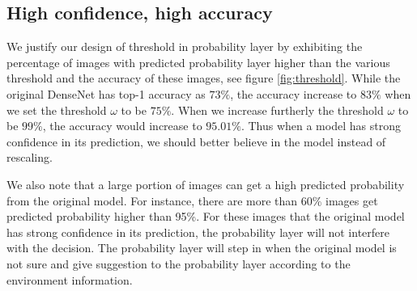 \documentclass[pageno]{jpaper}
\begin{document}
\subsection{High confidence, high accuracy}
We justify our design of threshold in probability layer by exhibiting the percentage of images with predicted probability layer higher than the various threshold and the accuracy of these images, see figure \ref{fig:threshold}. While the original DenseNet has top-1 accuracy as $73\%$, the accuracy increase to $83\%$ when we set the threshold $\omega$ to be $75\%$. When we increase furtherly the threshold $\omega$ to be $99\%$, the accuracy would increase to $95.01\%$. Thus when a model has strong confidence in its prediction, we should better believe in the model instead of rescaling. 

We also note that a large portion of images can get a high predicted probability from the original model. For instance, there are more than 60\% images get predicted probability higher than 95\%. For these images that the original model has strong confidence in its prediction, the probability layer will not interfere with the decision. The probability layer will step in when the original model is not sure and give suggestion to the probability layer according to the environment information. 
\end{document}

